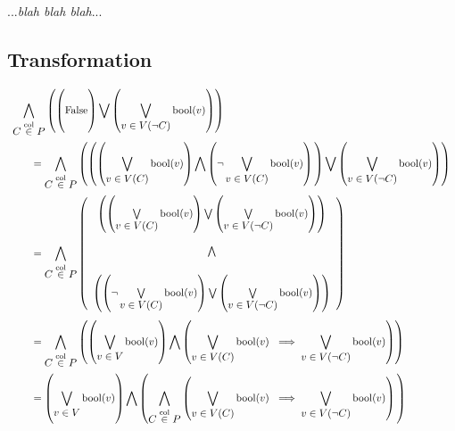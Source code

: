 \documentclass{article}
\newcommand{\combine}[7]{#1 #2 \vphantom{#6} #3 #4 #5 #6 \vphantom{#2} #7}
\begin{document}
...\textit{blah blah blah}...

\clearpage
\subsection{Transformation}

\[
\begin{array}{l}
	\displaystyle \bigwedge \limits_{\displaystyle C \overset{\mathrm{col}}{\in} P} \left( \combine{\left(}{\mathrm{False}}{\right)}{\bigvee}{\left(}{\bigvee \limits_{\displaystyle v \in V(\neg C)} \mathrm{bool}(v)}{\right)} \right) \\ [24pt]

	\displaystyle\qquad = \bigwedge \limits_{\displaystyle C \overset{\mathrm{col}}{\in} P} \left( \combine{\left(}{\combine{\left(}{\bigvee \limits_{\displaystyle v \in V(C)} \mathrm{bool}(v)}{\right)}{\bigwedge}{\left(}{\neg \bigvee \limits_{\displaystyle v \in V(C)} \mathrm{bool}(v)}{\right)}}{\right)}{\bigvee}{\left(}{\bigvee \limits_{\displaystyle v \in V(\neg C)} \mathrm{bool}(v)}{\right)} \right) \\ [24pt]

	\displaystyle\qquad = \bigwedge \limits_{\displaystyle C \overset{\mathrm{col}}{\in} P} \left( \begin{array}{c}
		\left( \combine{\left(}{\bigvee \limits_{\displaystyle v \in V(C)} \mathrm{bool}(v)}{\right)}{\bigvee}{\left(}{\bigvee \limits_{\displaystyle v \in V(\neg C)} \mathrm{bool}(v)}{\right)} \right) \\ [24pt]
		\bigwedge \\ [16pt]
		\left( \combine{\left(}{\neg \bigvee \limits_{\displaystyle v \in V(C)} \mathrm{bool}(v)}{\right)}{\bigvee}{\left(}{\bigvee \limits_{\displaystyle v \in V(\neg C)} \mathrm{bool}(v)}{\right)} \right)
	\end{array}
	\right) \\ [58pt]

	\displaystyle\qquad = \bigwedge \limits_{\displaystyle C \overset{\mathrm{col}}{\in} P} \left( \combine{\left(}{\bigvee \limits_{\displaystyle v \in V} \mathrm{bool}(v)}{\right)}{\bigwedge}{\left(}{\bigvee \limits_{\displaystyle v \in V(C)} \mathrm{bool}(v)\ \implies \bigvee \limits_{\displaystyle v \in V(\neg C)} \mathrm{bool}(v)}{\right)} \right) \\ [24pt]

	\displaystyle\qquad = \combine{\left(}{\bigvee \limits_{\displaystyle v \in V} \mathrm{bool}(v)}{\right)}{\bigwedge}{\left(}{\bigwedge \limits_{\displaystyle C \overset{\mathrm{col}}{\in} P} \left( \bigvee \limits_{\displaystyle v \in V(C)} \mathrm{bool}(v)\ \implies \bigvee \limits_{\displaystyle v \in V(\neg C)} \mathrm{bool}(v) \right)}{\right)}
\end{array}
\]
\end{document}
